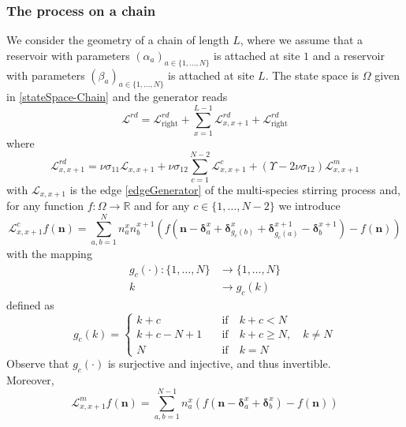 \documentclass[10pt]{article}
\numberwithin{equation}{section}
\numberwithin{equation}{subsection}
\begin{document}
\subsubsection{The process on a chain}
We consider the geometry of a chain of length $L$, where we assume that a reservoir with parameters $(\alpha_{a})_{a\in\{1,\ldots,N\}}$ is attached at site $1$ and a reservoir with parameters $(\beta_{a})_{a\in\{1,\ldots,N\}}$ is attached at site $L$. The state space is $\Omega$ given in \eqref{stateSpace-Chain} and the generator reads
\begin{equation}\label{RDGenerator}
	\mathcal{L}^{rd}=\mathcal{L}_{\text{right}}^{rd}+\sum_{x=1}^{L-1}\mathcal{L}_{x,x+1}^{rd}+\mathcal{L}_{\text{right}}^{rd}
\end{equation}
where
\begin{equation}\label{edgeGeneratorRD}
	\mathcal{L}_{x,x+1}^{rd}=\nu \sigma_{11}\mathcal{L}_{x,x+1}+\nu \sigma_{12}\sum_{c=1}^{N-2}\mathcal{L}_{x,x+1}^{c}+(\Upsilon-2\nu\sigma_{12})\mathcal{L}_{x,x+1}^{m}
\end{equation}
with $\mathcal{L}_{x,x+1}$ is the edge \eqref{edgeGenerator} of the multi-species stirring process and, for any function $f:\Omega\to \mathbb{R}$ and for any $c\in \{1,\ldots,N-2\}$ we introduce
\begin{equation}
	\mathcal{L}_{x,x+1}^{c}f(\bm{n})=\sum_{a,b=1}^{N}n_{a}^{x}n_{b}^{x+1}\left(f(\bm{n}-\bm{\delta}_{a}^{x}+\bm{\delta}_{g_{c}(b)}^{x}+\bm{\delta}_{g_{c}(a)}^{x+1}-\bm{\delta}_{b}^{x+1})-f(\bm{n})\right)
\end{equation}
with the mapping 
\begin{equation}
	\begin{split}
		g_{c}(\cdot):\{1,\ldots,N\}&\to\{1,\ldots,N\}\\
		k&\to g_{c}(k)
	\end{split}
\end{equation}
defined as
\begin{equation}
	g_{c}(k)=\begin{cases}
		k+c \quad &\text{if}\quad k+c< N \\
		k+c-N+1\quad &\text{if}\quad k+c\geq N,\quad k\neq N\\
		N\quad &\text{if}\quad k=N
	\end{cases}
\end{equation}
Observe that $g_{c}(\cdot)$ is surjective and injective, and thus invertible. \\
Moreover,
\begin{equation}
	\mathcal{L}_{x,x+1}^{m}f(\bm{n})=\sum_{a,b=1}^{N-1}n_{a}^{x}\left(f(\bm{n}-\bm{\delta}_{a}^{x}+\bm{\delta}_{b}^{x})-f(\bm{n})\right)
\end{equation}
\end{document}
